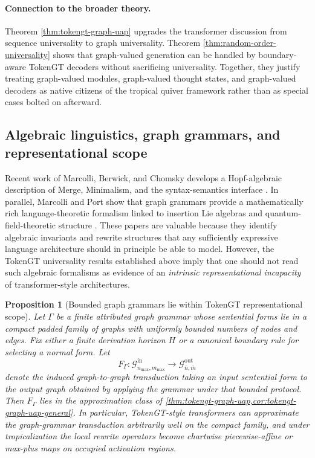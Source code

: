 \documentclass[11pt]{article}
\theoremstyle{definition}
\theoremstyle{plain}
\newtheorem{proposition}{Proposition}[section]
\theoremstyle{remark}
\newcommand{\mc}[1]{\mathcal{#1}}
\begin{document}
\paragraph{Connection to the broader theory.}
Theorem \ref{thm:tokengt-graph-uap} upgrades the transformer discussion from sequence universality to graph universality.
Theorem \ref{thm:random-order-universality} shows that graph-valued generation can be handled by boundary-aware TokenGT decoders without sacrificing universality.
Together, they justify treating graph-valued modules, graph-valued thought states, and graph-valued decoders as native citizens of the tropical quiver framework rather than as special cases bolted on afterward.

\subsection{Algebraic linguistics, graph grammars, and representational scope}
\label{sec:algebraic-linguistics}

Recent work of Marcolli, Berwick, and Chomsky develops a Hopf-algebraic description of Merge, Minimalism, and the syntax-semantics interface \cite{MarcolliChomskyBerwickMerge2023,MarcolliBerwickChomskyMinimalism2023,MarcolliBerwickChomskySyntaxSemantics2023}.
In parallel, Marcolli and Port show that graph grammars provide a mathematically rich language-theoretic formalism linked to insertion Lie algebras and quantum-field-theoretic structure \cite{MarcolliPortGraphGrammars2015}.
These papers are valuable because they identify algebraic invariants and rewrite structures that any sufficiently expressive language architecture should in principle be able to model.
However, the TokenGT universality results established above imply that one should not read such algebraic formalisms as evidence of an \emph{intrinsic representational incapacity} of transformer-style architectures.

\begin{proposition}[Bounded graph grammars lie within TokenGT representational scope]
\label{prop:graph-grammar-representability}
Let $\Gamma$ be a finite attributed graph grammar whose sentential forms lie in a compact padded family of graphs with uniformly bounded numbers of nodes and edges.
Fix either a finite derivation horizon $H$ or a canonical boundary rule for selecting a normal form.
Let
\[
F_{\Gamma}:
\mc{G}_{n_{\max},m_{\max}}^{\mathrm{in}}
\to
\mc{G}_{\bar n,\bar m}^{\mathrm{out}}
\]
denote the induced graph-to-graph transduction taking an input sentential form to the output graph obtained by applying the grammar under that bounded protocol.
Then $F_{\Gamma}$ lies in the approximation class of \cref{thm:tokengt-graph-uap,cor:tokengt-graph-uap-general}.
In particular, TokenGT-style transformers can approximate the graph-grammar transduction arbitrarily well on the compact family, and under tropicalization the local rewrite operators become chartwise piecewise-affine or max-plus maps on occupied activation regions.
\end{proposition}
\end{document}
